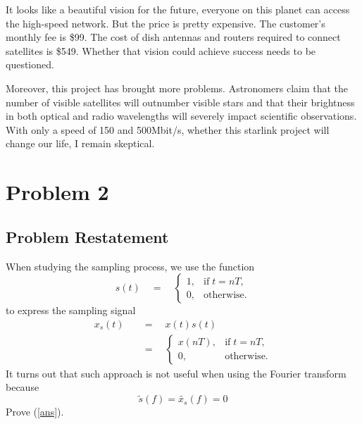 \documentclass{article}
\begin{document}
It looks like a  beautiful vision for the future, everyone on this planet can access the high-speed network. But the price is pretty expensive. The customer's monthly fee is \$99. The cost of dish antennas and routers required to connect satellites is \$549. Whether that vision could achieve success needs to be questioned.

Moreover, this project has brought more problems. Astronomers claim that the number of visible satellites will outnumber visible stars and that their brightness in both optical and radio wavelengths will severely impact scientific observations.\cite{BBC_starlink} With only a speed of 150 and 500Mbit/s, whether this starlink project will change our life, I remain skeptical.

\section{Problem 2}
\subsection{Problem Restatement}
When studying the sampling process, we use the function
\begin{equation}
    s(t) \quad = \quad \left\{ 
        \begin{array}{lr}
            1, & \mathrm{if}\; t = nT,\\
            0, & \mathrm{otherwise.}
        \end{array}
    \right.
    \label{original}
\end{equation}
to express the sampling signal
\begin{align}
    x_s(t) \quad &= \quad x(t)s(t)\\
    &= \quad \left\{
        \begin{array}{lr}
            x(nT), & \mathrm{if}\; t = nT,\\
            0, & \mathrm{otherwise.}
        \end{array}
    \right.
\end{align}
It turns out that such approach is not useful when using the Fourier transform because
\begin{equation}
    \widetilde{s}(f) = \widetilde{x_s}(f) = 0 
    \label{ans}
\end{equation}
Prove (\ref{ans}).
\end{document}
